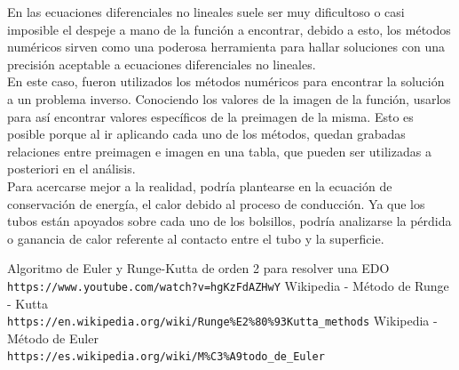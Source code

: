 \documentclass[10pt,a4paper]{article}
\begin{document}
En las ecuaciones diferenciales no lineales suele ser muy dificultoso o casi imposible el despeje a mano de la función a encontrar, debido a esto, los métodos numéricos sirven como una poderosa herramienta para hallar soluciones con una precisión aceptable a ecuaciones diferenciales no lineales.\\

En este caso, fueron utilizados los métodos numéricos para encontrar la solución a un problema inverso. Conociendo los valores de la imagen de la función, usarlos para así encontrar valores específicos de la preimagen de la misma. Esto es posible porque al ir aplicando cada uno de los métodos, quedan grabadas relaciones entre preimagen e imagen en una tabla, que pueden ser utilizadas a posteriori en el análisis.\\

Para acercarse mejor a la realidad, podría plantearse en la ecuación de conservación de energía, el calor debido al proceso de conducción. Ya que los tubos están apoyados sobre cada uno de los bolsillos, podría analizarse la pérdida o ganancia de calor referente al contacto entre el tubo y la superficie. \\




\begin{thebibliography}{9}
Algoritmo de Euler y Runge-Kutta de orden 2 para resolver una EDO
\\\texttt{https://www.youtube.com/watch?v=hgKzFdAZHwY}
Wikipedia - Método de Runge - Kutta
\\ \texttt{https://en.wikipedia.org/wiki/Runge\%E2\%80\%93Kutta\_methods}
Wikipedia - Método de Euler
\\ \texttt{https://es.wikipedia.org/wiki/M\%C3\%A9todo\_de\_Euler}
\end{thebibliography}

\end{document}
